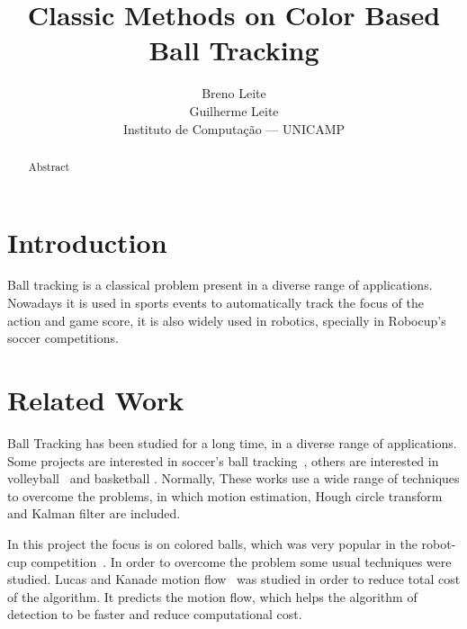\documentclass[10pt,twocolumn,letterpaper]{article}
\begin{document}
\title{Classic Methods on Color Based Ball Tracking}

\author{Breno Leite\\ Guilherme Leite\\
Instituto de Computa\c{c}\~ao --- UNICAMP\\
}

\maketitle

\begin{abstract}
  Abstract
\end{abstract}

\section{Introduction}

  Ball tracking is a classical problem present in a diverse range of
  applications. Nowadays it is used in sports events to automatically track the
  focus of the action and game score, it is also widely used in robotics,
  specially in Robocup’s soccer competitions.


\section{Related Work}

  Ball Tracking has been studied for a long time, in a diverse range of applications.  Some projects  are interested in soccer's ball tracking~\cite{seo1997ball,  tong2004effective, choi2004probabilistic}, others are interested in  volleyball~\cite{chen2007physics} and basketball \cite{ maksai2016players}.   Normally, These works use a wide range of techniques to overcome the problems,  in which motion estimation, Hough circle transform and Kalman filter are included. 
  
  In this project the focus is on colored balls, which was very popular in the robot-cup competition~\cite{kitano1997robocup, simon2000robust, kitano1998robocup}.  In order to overcome the problem some usual techniques were studied. Lucas and Kanade motion flow~\cite{tomasi1992shape, tomasi1991detection} was studied in order to reduce total cost of the algorithm.  It predicts the motion flow, which helps the algorithm of detection to be faster and reduce computational cost.
  
\end{document}
